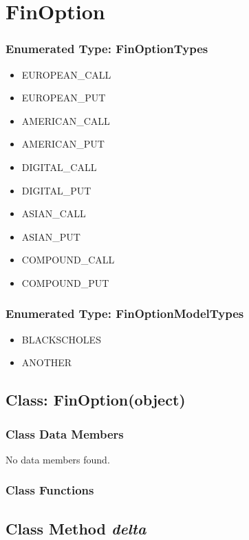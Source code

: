 \documentclass[twoside,11pt]{book}
\begin{document}
\newpage
\section{FinOption}

\subsubsection{Enumerated Type: FinOptionTypes}
\begin{itemize}
\item{EUROPEAN\_CALL}
\item{EUROPEAN\_PUT}
\item{AMERICAN\_CALL}
\item{AMERICAN\_PUT}
\item{DIGITAL\_CALL}
\item{DIGITAL\_PUT}
\item{ASIAN\_CALL}
\item{ASIAN\_PUT}
\item{COMPOUND\_CALL}
\item{COMPOUND\_PUT}
\end{itemize}

\subsubsection{Enumerated Type: FinOptionModelTypes}
\begin{itemize}
\item{BLACKSCHOLES}
\item{ANOTHER}
\end{itemize}

\subsection{Class: FinOption(object)}


\subsubsection{Class Data Members}
No data members found.

\subsubsection{Class Functions}

\subsection{Class Method {\it delta}}
\end{document}
